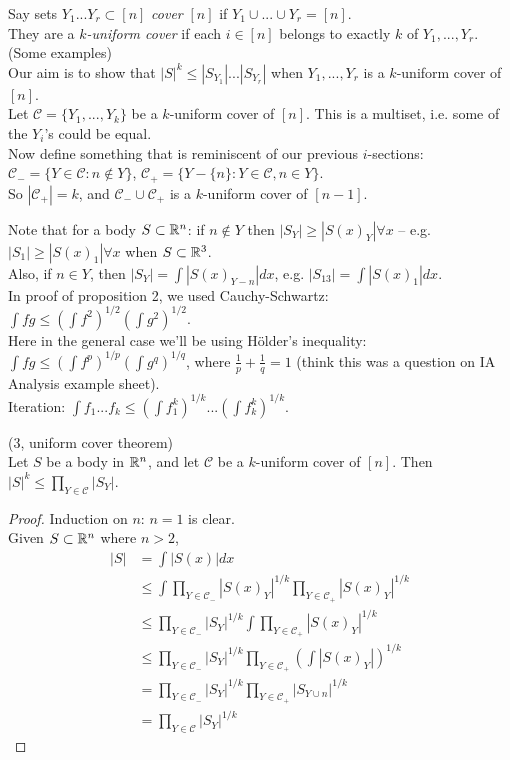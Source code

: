 \documentclass[a4paper]{article}
\begin{document}
Say sets $Y_1 ... Y_r \subset [n]$ \emph{cover} $[n]$ if $Y_1 \cup ... \cup Y_r = [n]$.\\
They are a \emph{$k$-uniform cover} if each $i \in [n]$ belongs to exactly $k$ of $Y_1,...,Y_r$.\\
(Some examples)\\
Our aim is to show that $|S|^k \leq |S_{Y_1}|...|S_{Y_r}|$ when $Y_1,...,Y_r$ is a $k$-uniform cover of $[n]$.\\
Let $\mathcal{C} = \{Y_1,...,Y_k\}$ be a $k$-uniform cover of $[n]$. This is a multiset, i.e. some of the $Y_i$'s could be equal.\\
Now define something that is reminiscent of our previous $i$-sections: $\mathcal{C}_- = \{Y \in \mathcal{C}:n \not\in Y\}$, $\mathcal{C}_+ = \{Y-\{n\} : Y \in \mathcal{C},n \in Y\}$.\\
So $|\mathcal{C}_+| = k$, and $\mathcal{C}_- \cup \mathcal{C}_+$ is a $k$-uniform cover of $[n-1]$.

Note that for a body $S \subset \mathbb{R}^n$: if $n \not\in Y$ then $|S_Y| \geq |S(x)_Y| \forall x$ -- e.g. $|S_1| \geq |S(x)_1| \forall x$ when $S \subset \mathbb{R}^3$.\\
Also, if $n \in Y$, then $|S_Y| = \int |S(x)_{Y-n}| dx$, e.g. $|S_{13}| = \int |S(x)_1| dx$.\\
In proof of proposition 2, we used Cauchy-Schwartz: $\int fg \leq (\int f^2)^{1/2} (\int g^2)^{1/2}$.\\
Here in the general case we'll be using H\"older's inequality: $\int fg \leq (\int f^p)^{1/p} (\int g^q)^{1/q}$, where $\frac{1}{p} + \frac{1}{q} = 1$ (think this was a question on IA Analysis example sheet).\\
Iteration: $\int f_1...f_k \leq (\int f_1^k)^{1/k} ... (\int f_k^k)^{1/k}$.

\begin{thm} (3, uniform cover theorem)\\
    Let $S$ be a body in $\mathbb{R}^n$, and let $\mathcal{C}$ be a $k$-uniform cover of $[n]$. Then $|S|^k \leq \prod_{Y \in \mathcal{C}} |S_Y|$.
    \begin{proof}
        Induction on $n$: $n=1$ is clear.\\
        Given $S \subset \mathbb{R}^n$ where $n>2$,
        \begin{align*}
            |S| &= \int |S(x)| dx\\
            &\leq \int \prod_{Y \in \mathcal{C}_-} |S(x)_Y|^{1/k} \prod_{Y \in \mathcal{C}_+} |S(x)_Y|^{1/k}\\
            &\leq \prod_{Y \in \mathcal{C}_-} |S_Y|^{1/k} \int \prod_{Y \in \mathcal{C}_+} |S(x)_Y|^{1/k}\\
            &\leq \prod_{Y \in \mathcal{C}_-} |S_Y|^{1/k} \prod_{Y \in \mathcal{C}_+} \left(\int |S(x)_Y|\right)^{1/k}\\
            &= \prod_{Y \in \mathcal{C}_-} |S_Y|^{1/k} \prod_{Y \in \mathcal{C}_+} |S_{Y \cup n}|^{1/k}\\
            &= \prod_{Y \in \mathcal{C}} |S_Y|^{1/k}
        \end{align*}
    \end{proof}
\end{thm}
\end{document}
